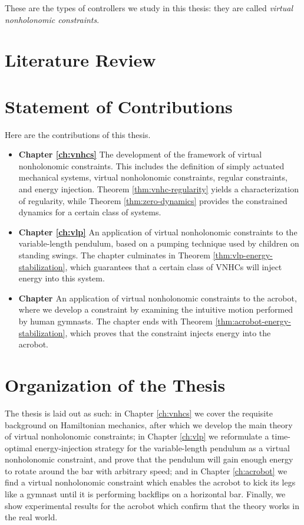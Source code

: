 These are the types of controllers we study in this thesis: they are called
\textit{virtual nonholonomic constraints}.

\section{Literature Review}


\section{Statement of Contributions}
Here are the contributions of this thesis.
\begin{itemize}[label={}]
   \item \textbf{Chapter \ref{ch:vnhcs}} The development of the framework of
      virtual nonholonomic constraints.
      This includes the definition of simply actuated mechanical systems, virtual
      nonholonomic constraints, regular constraints, and energy injection.
      Theorem \ref{thm:vnhc-regularity} yields a characterization of regularity, 
      while Theorem \ref{thm:zero-dynamics} provides the constrained dynamics
      for a certain class of systems.
   \item \textbf{Chapter \ref{ch:vlp}} An application of virtual nonholonomic
      constraints to the variable-length pendulum, based on a pumping technique
      used by children on standing swings.
      The chapter culminates in Theorem \ref{thm:vlp-energy-stabilization},
      which guarantees that a certain class of VNHCs will inject energy into
      this system.
   \item \textbf{Chapter \label{ch:acrobot}} An application of virtual
      nonholonomic constraints to the acrobot, where we develop a constraint
      by examining the intuitive motion performed by human gymnasts.
      The chapter ends with Theorem \ref{thm:acrobot-energy-stabilization},
      which proves that the constraint injects energy into the acrobot.
\end{itemize}

\section{Organization of the Thesis}
The thesis is laid out as such: 
in Chapter \ref{ch:vnhcs} we cover the requisite background on Hamiltonian
mechanics, after which we develop the main theory of virtual nonholonomic
constraints;
in Chapter \ref{ch:vlp} we reformulate a time-optimal energy-injection strategy
for the variable-length pendulum as a virtual nonholonomic constraint, and
prove that the pendulum will gain enough energy to rotate around the bar with
arbitrary speed;
and in Chapter \ref{ch:acrobot} we find a virtual nonholonomic constraint 
which enables the acrobot to kick its legs like a gymnast until it is
performing backflips on a horizontal bar.
Finally, we show experimental results for the acrobot which confirm that the
theory works in the real world.

